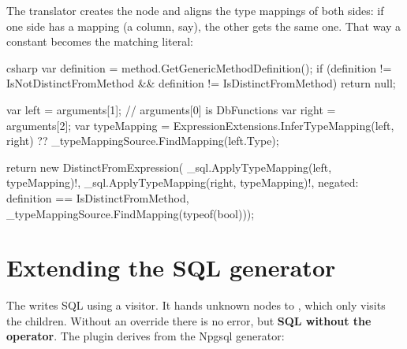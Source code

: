 The translator creates the node and aligns the type mappings of both sides: if one side has
a mapping (a column, say), the other gets the same one. That way a constant becomes the
matching literal:

\begin{sourcecode}{csharp}
var definition = method.GetGenericMethodDefinition();
if (definition != IsNotDistinctFromMethod && definition != IsDistinctFromMethod)
    return null;

var left = arguments[1];                        // arguments[0] is DbFunctions
var right = arguments[2];
var typeMapping = ExpressionExtensions.InferTypeMapping(left, right)
                  ?? _typeMappingSource.FindMapping(left.Type);

return new DistinctFromExpression(
    _sql.ApplyTypeMapping(left, typeMapping)!,
    _sql.ApplyTypeMapping(right, typeMapping)!,
    negated: definition == IsDistinctFromMethod,
    _typeMappingSource.FindMapping(typeof(bool)));
\end{sourcecode}

\section{Extending the SQL generator}

The  writes SQL using a visitor. It hands
unknown nodes to
, which only
visits the children. Without an override there is no error, but \textbf{SQL without the
operator}. The plugin derives from the Npgsql generator:

